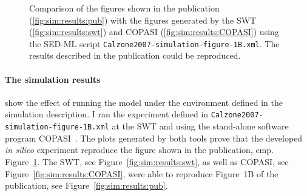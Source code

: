 \begin{figure}
\begin{center}
{\begin{minipage}[b]{.25\textwidth}
\end{minipage}
\label{fig:sim:results:swt}
}
\end{center}
\caption{Comparison of the figures shown in the publication (\ref{fig:sim:results:pub}) with the figures generated by the SWT (\ref{fig:sim:results:swt}) and COPASI (\ref{fig:sim:results:COPASI}) using the SED-ML script \texttt{Calzone2007-simulation-figure-1B.xml}. The results described in the publication could be reproduced.}
\label{fig:sim:results}
\end{figure}

\paragraph{The simulation results} show the effect of running the model under the environment defined in the simulation description.
I ran the experiment defined in \texttt{Calzone2007-simulation-figure-1B.xml} at the SWT and using the stand-alone software program COPASI~\cite{copasi}.
The plots generated by both tools prove that the developed \textit{in silico} experiment reproduce the figure shown in the publication, cmp. Figure~\ref{fig:sim:results}.
The SWT, see Figure~\ref{fig:sim:results:swt}, as well as COPASI, see Figure~\ref{fig:sim:results:COPASI}, were able to reproduce Figure~1B of the publication, see Figure~\ref{fig:sim:results:pub}.

